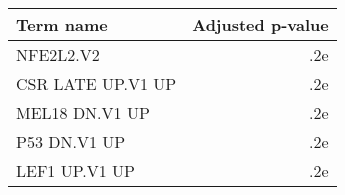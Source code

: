 \begin{tabular}{lr}
\toprule
        Term name &  Adjusted p-value \\
\midrule
        NFE2L2.V2 &               .2e \\
CSR LATE UP.V1 UP &               .2e \\
   MEL18 DN.V1 UP &               .2e \\
     P53 DN.V1 UP &               .2e \\
    LEF1 UP.V1 UP &               .2e \\
\bottomrule
\end{tabular}
